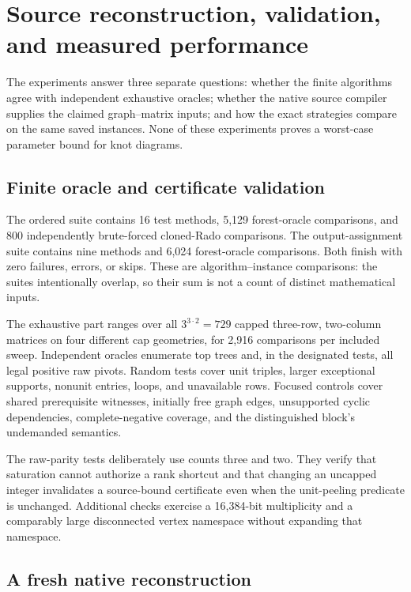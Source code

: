 \section{Source reconstruction, validation, and measured performance}
\label{sec:experiments}

The experiments answer three separate questions: whether the finite
algorithms agree with independent exhaustive oracles; whether the native
source compiler supplies the claimed graph--matrix inputs; and how the
exact strategies compare on the same saved instances. None of these
experiments proves a worst-case parameter bound for knot diagrams.

\subsection{Finite oracle and certificate validation}

The ordered suite contains 16 test methods, 5,129 forest-oracle
comparisons, and 800 independently brute-forced cloned-Rado comparisons.
The output-assignment suite contains nine methods and 6,024 forest-oracle
comparisons. Both finish with zero failures, errors, or skips. These are
algorithm--instance comparisons: the suites intentionally overlap, so
their sum is not a count of distinct mathematical inputs.

The exhaustive part ranges over all $3^{3\cdot2}=729$ capped
three-row, two-column matrices on four different cap geometries, for
2,916 comparisons per included sweep. Independent oracles enumerate top
trees and, in the designated tests, all legal positive raw pivots. Random
tests cover unit triples, larger exceptional supports, nonunit entries,
loops, and unavailable rows. Focused controls cover shared prerequisite
witnesses, initially free graph edges, unsupported cyclic dependencies,
complete-negative coverage, and the distinguished block's undemanded
semantics.

The raw-parity tests deliberately use counts three and two. They verify
that saturation cannot authorize a rank shortcut and that changing an
uncapped integer invalidates a source-bound certificate even when the
unit-peeling predicate is unchanged. Additional checks exercise a
16,384-bit multiplicity and a comparably large disconnected vertex
namespace without expanding that namespace.

\subsection{A fresh native reconstruction}

